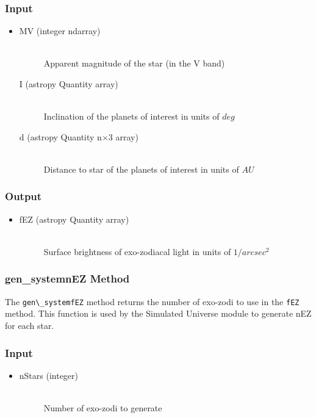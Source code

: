 \documentclass[cleanfoot]{asme2ej}
\begin{document}
\subsubsection*{Input}
\begin{itemize}
\item 
\begin{description}
    \item[MV (integer ndarray)] \hfill \\ Apparent magnitude of the star (in the V band)
    \item[I (astropy Quantity array)] \hfill \\ Inclination of the planets of interest in units of $ deg $
    \item[d (astropy Quantity n$\times$3 array)] \hfill \\ Distance to star of the planets of interest in units of $AU$
\end{description}
\end{itemize}

\subsubsection*{Output}
\begin{itemize}
\item 
\begin{description}
    \item[fEZ (astropy Quantity array)] \hfill \\ Surface brightness of exo-zodiacal light in units of $ 1/arcsec^2 $
\end{description}
\end{itemize}

\subsubsection{gen\_systemnEZ Method} \label{sec:exozoditask}
The \verb+gen\_systemfEZ+ method returns the number of exo-zodi to use in the \verb+fEZ+ method. This function is used by the Simulated Universe module to generate nEZ for each star.

\subsubsection*{Input}
\begin{itemize}
\item 
\begin{description}
    \item[nStars (integer)] \hfill \\ Number of exo-zodi to generate
\end{description}
\end{itemize}
\end{document}
